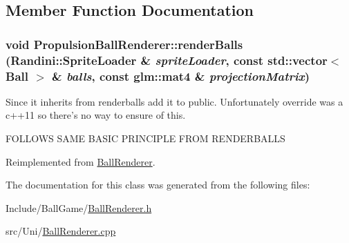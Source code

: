 \subsection{Member Function Documentation}
\hypertarget{classPropulsionBallRenderer_a9ebdecb973a1a399b4699d7e5c47c0b9}{
\subsubsection[{renderBalls}]{\setlength{\rightskip}{0pt plus 5cm}void PropulsionBallRenderer::renderBalls ({\bf Randini::SpriteLoader} \& {\em spriteLoader}, \/  const std::vector$<$ {\bf Ball} $>$ \& {\em balls}, \/  const glm::mat4 \& {\em projectionMatrix})}}
\label{classPropulsionBallRenderer_a9ebdecb973a1a399b4699d7e5c47c0b9}


Since it inherits from renderballs add it to public. Unfortunately override was a c++11 so there's no way to ensure of this. 

FOLLOWS SAME BASIC PRINCIPLE FROM RENDERBALLS 

Reimplemented from \hyperlink{classBallRenderer_a6169ba2a00e8d15fde87a3ee4552cf66}{BallRenderer}.

The documentation for this class was generated from the following files:\begin{DoxyCompactItemize}
\item 
Include/BallGame/\hyperlink{BallRenderer_8h}{BallRenderer.h}\item 
src/Uni/\hyperlink{BallRenderer_8cpp}{BallRenderer.cpp}\end{DoxyCompactItemize}

